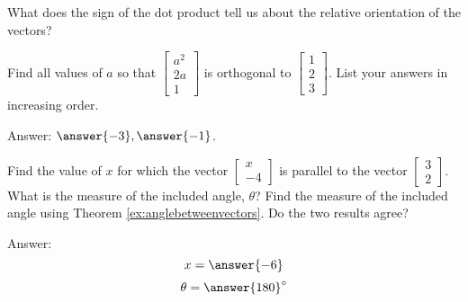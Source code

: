 \documentclass{ximera}
\begin{document}
\begin{problem}\label{prob:dotproductsign}
What does the sign of the dot product tell us about the relative orientation of the vectors?
\begin{multipleChoice}
\end{multipleChoice}
\end{problem}
 
\begin{problem}\label{prob:orthvectorsdot}
Find all values of $a$ so that $\begin{bmatrix}a^2\\2a\\1\end{bmatrix}$ is orthogonal to $\begin{bmatrix}1\\2\\3\end{bmatrix}$.  List your answers in increasing order.
 
Answer: $\answer{-3}, \answer{-1}$.
\end{problem}
 
\begin{problem}\label{prob:parallelvectdot}
Find the value of $x$ for which the vector $\begin{bmatrix}x\\-4\end{bmatrix}$ is parallel to the vector $\begin{bmatrix}3\\2\end{bmatrix}$. What is the measure of the included angle, $\theta$? Find the measure of the included angle using Theorem \ref{ex:anglebetweenvectors}.  Do the two results agree?
 
Answer:
$$x=\answer{-6}$$
$$\theta=\answer{180}^\circ$$
\end{problem}
\end{document}
